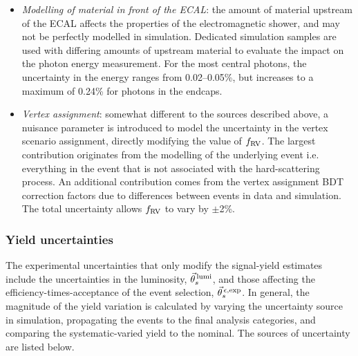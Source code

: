 \begin{itemize}
    \item \textit{Modelling of material in front of the ECAL}: the amount of material upstream of the ECAL affects the properties of the electromagnetic shower, and may not be perfectly modelled in simulation. Dedicated simulation samples are used with differing amounts of upstream material to evaluate the impact on the photon energy measurement. For the most central photons, the uncertainty in the energy ranges from 0.02--0.05\%, but increases to a maximum of 0.24\% for photons in the endcaps.
    
    \item \textit{Vertex assignment}: somewhat different to the sources described above, a nuisance parameter is introduced to model the uncertainty in the vertex scenario assignment, directly modifying the value of $f_{{\rm{RV}}}$. The largest contribution originates from the modelling of the underlying event i.e. everything in the event that is not associated with the hard-scattering process. An additional contribution comes from the vertex assignment BDT correction factors due to differences between \Zmumu events in data and simulation. The total uncertainty allows $f_{{\rm{RV}}}$ to vary by $\pm$2\%.
\end{itemize}

\subsubsection{Yield uncertainties}
The experimental uncertainties that only modify the signal-yield estimates include the uncertainties in the luminosity, $\vec{\theta}^{\,\rm{lumi}}_{s}$, and those affecting the efficiency-times-acceptance of the event selection, $\vec{\theta}^{\,\epsilon,{\rm{exp}}}_{s}$. In general, the magnitude of the yield variation is calculated by varying the uncertainty source in simulation, propagating the events to the final analysis categories, and comparing the systematic-varied yield to the nominal. The sources of uncertainty are listed below.

